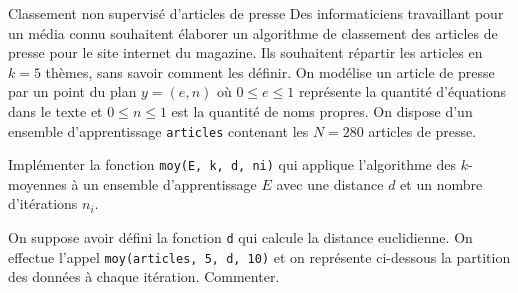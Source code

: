 \documentclass[12pt,fancy]{cours}
\begin{document}

\begin{exemple}{Classement non supervisé d'articles de presse}
    Des informaticiens travaillant pour un média connu souhaitent élaborer un algorithme de classement des articles de presse pour le site internet du magazine. Ils souhaitent répartir les articles en $k=5$ thèmes, sans savoir comment les définir. On modélise un article de presse par un point du plan $y=(e,n)$ où $0\leq e \leq 1$ représente la quantité d'équations dans le texte et $0\leq n \leq 1$ est la quantité de noms propres. On dispose d'un ensemble d'apprentissage \texttt{articles} contenant les $N=280$ articles de presse. 
  
    
  \begin{quest}
    \item Implémenter la fonction \texttt{moy(E, k, d, ni)} qui applique l'algorithme des $k$-moyennes à un ensemble d'apprentissage $E$ avec une distance $d$ et un nombre d'itérations $n_i$.
    
    \item On suppose avoir défini la fonction \texttt{d} qui calcule la distance euclidienne. On effectue l'appel \texttt{moy(articles, 5, d, 10)} et on représente ci-dessous la partition des données à chaque itération. Commenter.
    

\end{quest}
\end{exemple}
\end{document}
